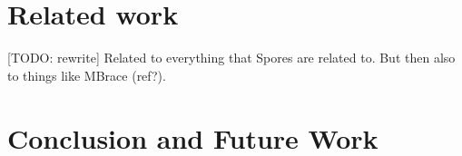 \documentclass{easychair}
\begin{document}
\section{Related work}


[TODO: rewrite] Related to everything that Spores are related to. But then
also to things like MBrace (ref?).


\section{Conclusion and Future Work}
\label{sec:conclusion}

%
\begin{spacing}{0.9}


\end{spacing}
\end{document}
